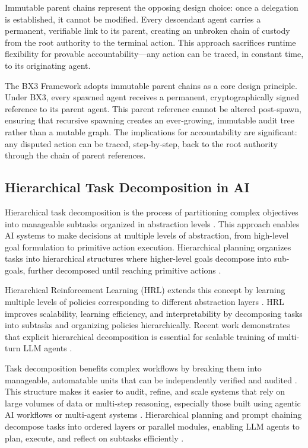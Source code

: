Immutable parent chains represent the opposing design choice: once a delegation is established, it cannot be modified. Every descendant agent carries a permanent, verifiable link to its parent, creating an unbroken chain of custody from the root authority to the terminal action. This approach sacrifices runtime flexibility for provable accountability—any action can be traced, in constant time, to its originating agent.

The BX3 Framework adopts immutable parent chains as a core design principle. Under BX3, every spawned agent receives a permanent, cryptographically signed reference to its parent agent. This parent reference cannot be altered post-spawn, ensuring that recursive spawning creates an ever-growing, immutable audit tree rather than a mutable graph. The implications for accountability are significant: any disputed action can be traced, step-by-step, back to the root authority through the chain of parent references.

\subsection{Hierarchical Task Decomposition in AI}

Hierarchical task decomposition is the process of partitioning complex objectives into manageable subtasks organized in abstraction levels \cite{geeksforgeeks_hierarchical_planning}. This approach enables AI systems to make decisions at multiple levels of abstraction, from high-level goal formulation to primitive action execution. Hierarchical planning organizes tasks into hierarchical structures where higher-level goals decompose into sub-goals, further decomposed until reaching primitive actions \cite{geeksforgeeks_hierarchical_planning}.

Hierarchical Reinforcement Learning (HRL) extends this concept by learning multiple levels of policies corresponding to different abstraction layers \cite{geeksforgeeks_hrl}. HRL improves scalability, learning efficiency, and interpretability by decomposing tasks into subtasks and organizing policies hierarchically. Recent work demonstrates that explicit hierarchical decomposition is essential for scalable training of multi-turn LLM agents \cite{hyper_arxiv2602}.

Task decomposition benefits complex workflows by breaking them into manageable, automatable units that can be independently verified and audited \cite{task_decomposition_ai21}. This structure makes it easier to audit, refine, and scale systems that rely on large volumes of data or multi-step reasoning, especially those built using agentic AI workflows or multi-agent systems \cite{task_decomposition_ai21}. Hierarchical planning and prompt chaining decompose tasks into ordered layers or parallel modules, enabling LLM agents to plan, execute, and reflect on subtasks efficiently \cite{ai21_task_decomposition}.

